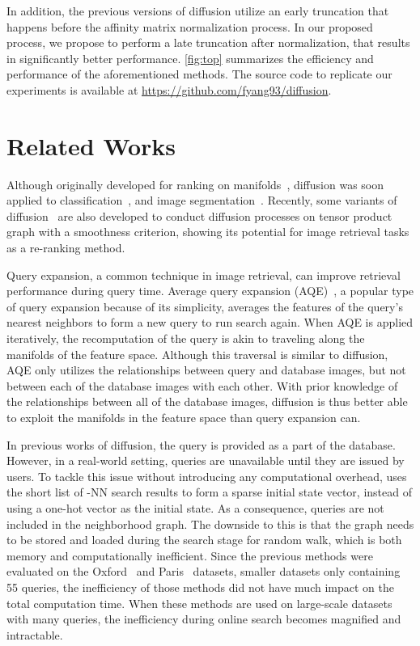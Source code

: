 \documentclass[letterpaper]{article} \usepackage{aaai19}  \usepackage{times}  \usepackage{helvet}  \usepackage{courier}  \usepackage{url}  \usepackage{graphicx}  \frenchspacing  \setlength{\pdfpagewidth}{8.5in}  \setlength{\pdfpageheight}{11in}
\begin{document}
In addition, the previous versions of diffusion utilize an early truncation that happens before the affinity matrix normalization process.
In our proposed process, we propose to perform a late truncation after normalization, that results in significantly better performance.
\cref{fig:top} summarizes the efficiency and performance of the aforementioned methods.
The source code to replicate our experiments is available at \url{https://github.com/fyang93/diffusion}.


\section{Related Works}

Although originally developed for ranking on manifolds~\cite{page1999pagerank,zhou2004ranking,donoser2013diffusion}, diffusion was soon applied to classification~\cite{zhou2004learning}, and image segmentation~\cite{grady2006random}.
Recently, some variants of diffusion~\cite{bai2017regularized,bai2017ensemble,bai2018regularized,bai2019automatic} are also developed to conduct diffusion processes on tensor product graph with a smoothness criterion, showing its potential for image retrieval tasks as a re-ranking method.

Query expansion, a common technique in image retrieval, can improve retrieval performance during query time.
Average query expansion (AQE)~\cite{chum2007total,iscen2017efficient}, a popular type of query expansion because of its simplicity, averages the features of the query's nearest neighbors to form a new query to run search again. 
When AQE is applied iteratively, the recomputation of the query is akin to traveling along the manifolds of the feature space.
Although this traversal is similar to diffusion, AQE only utilizes the relationships between query and database images, but not between each of the database images with each other.
With prior knowledge of the relationships between all of the database images, diffusion is thus better able to exploit the manifolds in the feature space than query expansion can. 

In previous works of diffusion, the query is provided as a part of the database.
However, in a real-world setting, queries are unavailable until they are issued by users.
To tackle this issue without introducing any computational overhead, \cite{iscen2017efficient} uses the short list of -NN search results to form a sparse initial state vector, instead of using a one-hot vector as the initial state.
As a consequence, queries are not included in the neighborhood graph.
The downside to this is that the graph needs to be stored and loaded during the search stage for random walk, which is both memory and computationally inefficient.
Since the previous methods were evaluated on the Oxford~\cite{philbin2007object} and Paris~\cite{philbin2008lost} datasets, smaller datasets only containing 55 queries, the inefficiency of those methods did not have much impact on the total computation time.
When these methods are used on large-scale datasets with many queries, the inefficiency during online search becomes magnified and intractable.
\end{document}
